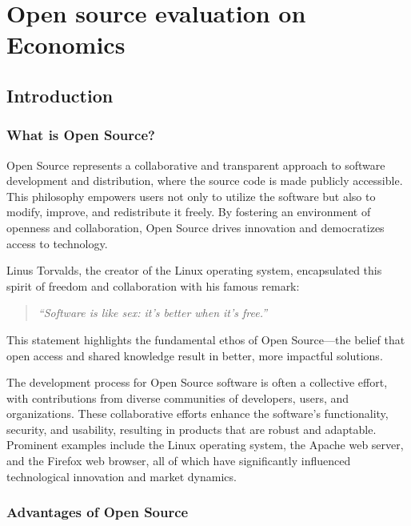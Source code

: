 \chapter{Open source evaluation on Economics}
\label{cha:Open_source_evaluation_Economics}

\section{Introduction}

\subsection{What is Open Source?}

Open Source represents a collaborative and transparent approach to software development and distribution, 
where the source code is made publicly accessible. This philosophy empowers users not only to utilize the software but also to modify, 
improve, and redistribute it freely. By fostering an environment of openness and collaboration, 
Open Source drives innovation and democratizes access to technology.

Linus Torvalds, the creator of the Linux operating system, encapsulated this spirit of freedom and collaboration with his famous remark:

\begin{quote}
    \textit{“Software is like sex: it's better when it's free.”}
    \author{Linus Torvalds}
\end{quote}

This statement highlights the fundamental ethos of Open Source—the belief that open access and shared knowledge result in better, more impactful solutions.


The development process for Open Source software is often a collective effort, 
with contributions from diverse communities of developers, users, and organizations. 
These collaborative efforts enhance the software's functionality, security, and usability, 
resulting in products that are robust and adaptable. Prominent examples include the Linux operating system, 
the Apache web server, and the Firefox web browser, all of which have significantly influenced technological innovation and market dynamics.

\subsection{Advantages of Open Source}

